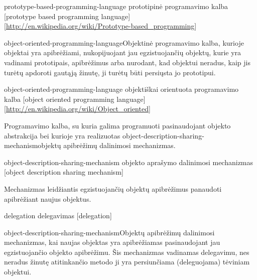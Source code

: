 \begin{glossary}
\begin{entry}
  \end{entry}%
    
  \begin{entry}%
    {prototype-based-programming-language}%
    {prototipinė programavimo kalba}%
    [prototype based programming language]%
    [\url{http://en.wikipedia.org/wiki/Prototype-based_programming}]

    \gls{object-oriented-programming-language}{Objektinė programavimo
    kalba}, kurioje objektai yra apibrėžiami, nukopijuojant jau
    egzistuojančių objektų, kurie yra vadinami prototipais,
    apibrėžimus arba nurodant, kad objektui neradus, kaip jis
    turėtų apdoroti gautąją žinutę, ji turėtų būti persiųsta
    jo prototipui.\cite[176]{Wegner:1987:DOL:38807.38823}
    
  \end{entry}
    
  \begin{entry}%
    {object-oriented-programming-language}%
    {objektiškai orientuota programavimo kalba}%
    [object oriented programming language]%
    [\url{http://en.wikipedia.org/wiki/Object_oriented}]

    Programavimo kalba, su kuria galima programuoti pasinaudojant
    objekto abstrakcija bei kurioje yra realizuotas 
    \gls{object-description-sharing-mechanism}{objektų apibrėžimų
    dalinimosi mechanizmas}.
    
  \end{entry}

  \begin{entry}%
    {object-description-sharing-mechanism}%
    {objekto aprašymo dalinimosi mechanizmas}%
    [object description sharing mechanism]

    Mechanizmas leidžiantis egzistuojančių objektų apibrėžimus panaudoti
    apibrėžiant naujus objektus.
    
  \end{entry}

  \begin{entry}%
    {delegation}%
    {delegavimas}%
    [delegation]

    \gls{object-description-sharing-mechanism}{Objektų apibrėžimų
    dalinimosi mechanizmas}, kai naujas objektas yra apibrėžiamas
    pasinaudojant jau egzistuojančio objekto apibrėžimu. Šis
    mechanizmas vadinamas delegavimu, nes neradus žinutę atitinkančio
    metodo ji yra persiunčiama (deleguojama) tėviniam objektui.
    
  \end{entry}


\end{glossary}
